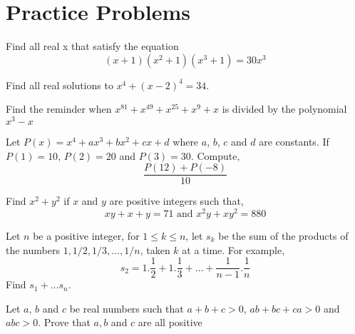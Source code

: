 \section{Practice Problems}
\begin{problem}
Find all real x that satisfy the equation
\[ (x+1)(x^2+1)(x^3+1)= 30x^3 \]
\begin{hint}
\addhint{}
\addhint{}
\end{hint}
\end{problem}
\begin{problem}
Find all real solutions to $ x^4 +(x-2)^4 = 34$.
\begin{hint}
\addhint{}
\addhint{}
\end{hint}
\end{problem}
\begin{problem}
Find the reminder when $x^81 + x^49 +x^25 + x^9 +x $ is divided by the polynomial $x^3-x$
\begin{hint}
\addhint{}
\addhint{}
\end{hint}
\end{problem}
\begin{problem}
Let $P(x) = x^4 + ax^3 + bx^2 + cx + d$ where $a$, $b$, $c$ and $d$ are constants. If $P(1) = 10$, $P(2) = 20$ and $P(3)= 30$. Compute,
\[\frac{P(12)+ P(-8)}{10} \]
\begin{hint}
\addhint{}
\addhint{}
\end{hint}
\end{problem}
\begin{problem}
Find $x^2+y^2 $ if $x$ and $y$ are positive integers such that,
\[xy + x+ y = 71 \text{ and } x^2y +xy^2 =880\]
\begin{hint}
\addhint{}
\addhint{}
\end{hint}
\end{problem}
\begin{problem}
Let $n$ be a positive integer, for $1\le k \le n$, let $s_k$ be the sum of the products of the numbers $1, 1/2,1/3,  \ldots ,1/n$, taken $k $ at a time. For example, 
\[ s_2 = 1.\frac{1}{2} + 1.\frac{1}{3}+ \ldots +\frac{1}{n-1}.\frac{1}{n} \] 
Find $s_1 +\ldots s_n$.
\begin{hint}
\addhint{}
\addhint{}
\end{hint}
\end{problem}
\begin{problem}
Let $a$, $b$ and $c$ be real numbers such that $a+b+c>0$, $ab+bc+ca>0$ and $abc>0$. Prove that $a,b$ and $c$ are all positive
\begin{hint}
\addhint{}
\addhint{}
\end{hint}
\end{problem}
